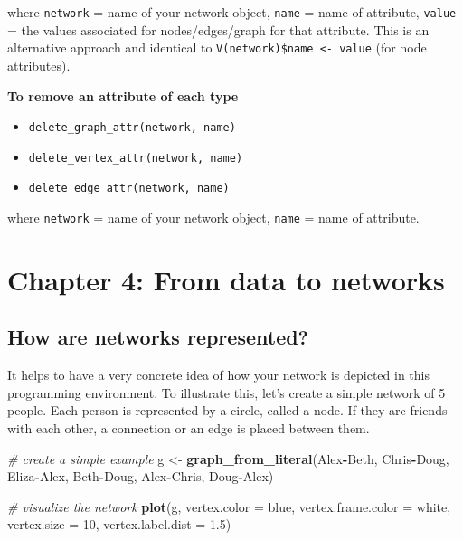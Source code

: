 \documentclass[
]{book}
\newenvironment{Shaded}{\begin{snugshade}}{\end{snugshade}}
\newcommand{\AttributeTok}[1]{\textcolor[rgb]{0.13,0.29,0.53}{#1}}
\newcommand{\CommentTok}[1]{\textcolor[rgb]{0.56,0.35,0.01}{\textit{#1}}}
\newcommand{\DecValTok}[1]{\textcolor[rgb]{0.00,0.00,0.81}{#1}}
\newcommand{\FloatTok}[1]{\textcolor[rgb]{0.00,0.00,0.81}{#1}}
\newcommand{\FunctionTok}[1]{\textcolor[rgb]{0.13,0.29,0.53}{\textbf{#1}}}
\newcommand{\NormalTok}[1]{#1}
\newcommand{\OtherTok}[1]{\textcolor[rgb]{0.56,0.35,0.01}{#1}}
\newcommand{\SpecialCharTok}[1]{\textcolor[rgb]{0.81,0.36,0.00}{\textbf{#1}}}
\newcommand{\StringTok}[1]{\textcolor[rgb]{0.31,0.60,0.02}{#1}}
\providecommand{\tightlist}{%
  \setlength{\itemsep}{0pt}\setlength{\parskip}{0pt}}
\begin{document}
where \texttt{network} = name of your network object, \texttt{name} = name of attribute, \texttt{value} = the values associated for nodes/edges/graph for that attribute. This is an alternative approach and identical to \texttt{V(network)\$name\ \textless{}-\ value} (for node attributes).

\textbf{To remove an attribute of each type}

\begin{itemize}
\tightlist
\item
  \texttt{delete\_graph\_attr(network,\ name)}
\item
  \texttt{delete\_vertex\_attr(network,\ name)}
\item
  \texttt{delete\_edge\_attr(network,\ name)}
\end{itemize}

where \texttt{network} = name of your network object, \texttt{name} = name of attribute.

\chapter{Chapter 4: From data to networks}\label{ch4}

\section{How are networks represented?}\label{how-are-networks-represented}

It helps to have a very concrete idea of how your network is depicted in this programming environment. To illustrate this, let's create a simple network of 5 people. Each person is represented by a circle, called a node. If they are friends with each other, a connection or an edge is placed between them.

\begin{Shaded}
\begin{Highlighting}[]
\CommentTok{\# create a simple example }
\NormalTok{g }\OtherTok{\textless{}{-}} \FunctionTok{graph\_from\_literal}\NormalTok{(Alex}\SpecialCharTok{{-}}\NormalTok{Beth, Chris}\SpecialCharTok{{-}}\NormalTok{Doug, Eliza}\SpecialCharTok{{-}}\NormalTok{Alex, Beth}\SpecialCharTok{{-}}\NormalTok{Doug, }
\NormalTok{                        Alex}\SpecialCharTok{{-}}\NormalTok{Chris, Doug}\SpecialCharTok{{-}}\NormalTok{Alex)}

\CommentTok{\# visualize the network}
\FunctionTok{plot}\NormalTok{(g, }\AttributeTok{vertex.color =} \StringTok{\textquotesingle{}blue\textquotesingle{}}\NormalTok{, }\AttributeTok{vertex.frame.color =} \StringTok{\textquotesingle{}white\textquotesingle{}}\NormalTok{, }\AttributeTok{vertex.size =} \DecValTok{10}\NormalTok{, }
     \AttributeTok{vertex.label.dist =} \FloatTok{1.5}\NormalTok{)}
\end{Highlighting}
\end{Shaded}
\end{document}
